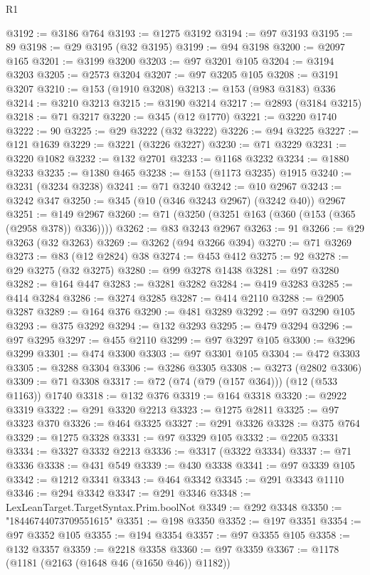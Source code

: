 \begin{lexlean}{R1}
\begin{coremodule}
@3192 := @3186 @764
@3193 := @1275 @3192
@3194 := @97 @3193
@3195 := 89
@3198 := @29 @3195 (@32 @3195)
@3199 := @94 @3198
@3200 := @2097 @165
@3201 := @3199 @3200
@3203 := @97 @3201 @105
@3204 := @3194 @3203
@3205 := @2573 @3204
@3207 := @97 @3205 @105
@3208 := @3191 @3207
@3210 := @153 (@1910 @3208)
@3213 := @153 (@983 @3183) @336
@3214 := @3210 @3213
@3215 := @3190 @3214
@3217 := @2893 (@3184 @3215)
@3218 := @71 @3217
@3220 := @345 (@12 @1770)
@3221 := @3220 @1740
@3222 := 90
@3225 := @29 @3222 (@32 @3222)
@3226 := @94 @3225
@3227 := @121 @1639
@3229 := @3221 (@3226 @3227)
@3230 := @71 @3229
@3231 := @3220 @1082
@3232 := @132 @2701
@3233 := @1168 @3232
@3234 := @1880 @3233
@3235 := @1380 @465
@3238 := @153 (@1173 @3235) @1915
@3240 := @3231 (@3234 @3238)
@3241 := @71 @3240
@3242 := @10 @2967
@3243 := @3242 @347
@3250 := @345 (@10 (@346 @3243 @2967) (@3242 @40)) @2967
@3251 := @149 @2967
@3260 := @71 (@3250 (@3251 @163 (@360 (@153 (@365 (@2958 @378)) @336))))
@3262 := @83 @3243 @2967
@3263 := 91
@3266 := @29 @3263 (@32 @3263)
@3269 := @3262 (@94 @3266 @394)
@3270 := @71 @3269
@3273 := @83 (@12 @2824) @38
@3274 := @453 @412
@3275 := 92
@3278 := @29 @3275 (@32 @3275)
@3280 := @99 @3278 @1438
@3281 := @97 @3280
@3282 := @164 @447
@3283 := @3281 @3282
@3284 := @419 @3283
@3285 := @414 @3284
@3286 := @3274 @3285
@3287 := @414 @2110
@3288 := @2905 @3287
@3289 := @164 @376
@3290 := @481 @3289
@3292 := @97 @3290 @105
@3293 := @375 @3292
@3294 := @132 @3293
@3295 := @479 @3294
@3296 := @97 @3295
@3297 := @455 @2110
@3299 := @97 @3297 @105
@3300 := @3296 @3299
@3301 := @474 @3300
@3303 := @97 @3301 @105
@3304 := @472 @3303
@3305 := @3288 @3304
@3306 := @3286 @3305
@3308 := @3273 (@2802 @3306)
@3309 := @71 @3308
@3317 := @72 (@74 (@79 (@157 @364))) (@12 (@533 @1163)) @1740
@3318 := @132 @376
@3319 := @164 @3318
@3320 := @2922 @3319
@3322 := @291 @3320 @2213
@3323 := @1275 @2811
@3325 := @97 @3323 @370
@3326 := @464 @3325
@3327 := @291 @3326
@3328 := @375 @764
@3329 := @1275 @3328
@3331 := @97 @3329 @105
@3332 := @2205 @3331
@3334 := @3327 @3332 @2213
@3336 := @3317 (@3322 @3334)
@3337 := @71 @3336
@3338 := @431 @549
@3339 := @430 @3338
@3341 := @97 @3339 @105
@3342 := @1212 @3341
@3343 := @464 @3342
@3345 := @291 @3343 @1110
@3346 := @294 @3342
@3347 := @291 @3346
@3348 := LexLeanTarget.TargetSyntax.Prim.boolNot
@3349 := @292 @3348
@3350 := "18446744073709551615"
@3351 := @198 @3350
@3352 := @197 @3351
@3354 := @97 @3352 @105
@3355 := @194 @3354
@3357 := @97 @3355 @105
@3358 := @132 @3357
@3359 := @2218 @3358
@3360 := @97 @3359
@3367 := @1178 (@1181 (@2163 (@1648 @46 (@1650 @46)) @1182))

\end{coremodule}
\end{lexlean}
